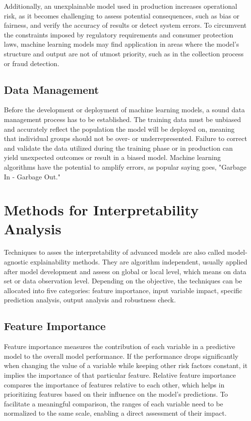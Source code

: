 Additionally, an unexplainable model used in production increases operational risk, as it becomes challenging to assess potential consequences, such as bias or fairness, and verify the accuracy of results or detect system errors. To circumvent the constraints imposed by regulatory requirements and consumer protection laws, machine learning models may find application in areas where the model's structure and output are not of utmost priority, such as in the collection process or fraud detection. \cite[pp.~57, 58]{Roberts2022} \cite[p.~89]{Witzany:2017}

\subsection{Data Management}
Before the development or deployment of machine learning models, a sound data management process has to be established. The training data must be unbiased and accurately reflect the population the model will be deployed on, meaning that individual groups should not be over- or underrepresented. Failure to correct and validate the data utilized during the training phase or in production can yield unexpected outcomes or result in a biased model. Machine learning algorithms have the potential to amplify errors, as popular saying goes, "Garbage In - Garbage Out." \cite[p.~61]{Roberts2022}

\section{Methods for Interpretability Analysis}
Techniques to asses the interpretability of advanced models are also called model-agnostic explainability methods. They are algorithm independent, usually applied after model development and assess on global or local level, which means on data set or data observation level. Depending on the objective, the techniques can be allocated into five categories: feature importance, input variable impact, specific prediction analysis, output analysis and robustness check. \cite[p.~62]{Roberts2022}

\subsection{Feature Importance}
Feature importance measures the contribution of each variable in a predictive model to the overall model performance. If the performance drops significantly when changing the value of a variable while keeping other risk factors constant, it implies the importance of that particular feature. Relative feature importance compares the importance of features relative to each other, which helps in prioritizing features based on their influence on the model's predictions. To facilitate a meaningful comparison, the ranges of each variable need to be normalized to the same scale, enabling a direct assessment of their impact. \cite[p.~63]{Roberts2022}

